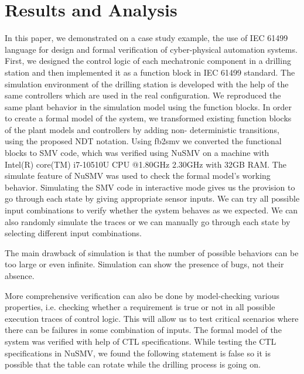 \documentclass[conference]{IEEEtran}
\begin{document}


\section{Results and Analysis}

In this paper, we demonstrated on a case study example, the use of IEC 61499 language for design and formal verification of cyber-physical automation systems. First, we designed the control logic of each mechatronic component in a drilling station and then implemented it as a function block in IEC 61499 standard. The simulation environment of the drilling station is developed with the help of the same controllers which are used in the real configuration. We reproduced the same plant behavior in the simulation model using the function blocks. In order to create a formal model of the system, we transformed existing function blocks of the plant models and controllers by adding non- deterministic transitions, using the proposed NDT notation. Using fb2smv  we converted the functional blocks to SMV code, which was verified using NuSMV on a machine with  Intel(R) core(TM) i7-10510U CPU @1.80GHz 2.30GHz  with 32GB RAM. The simulate feature of NuSMV was used to check the formal model's working behavior. Simulating the SMV code in interactive mode gives us the provision to go through each state by giving appropriate sensor inputs. We can try all possible input combinations to verify whether the system behaves as we expected. We can also randomly simulate the traces or we can manually go through each state by selecting different input combinations.

The main drawback of simulation is that the number of possible behaviors can be too large or even infinite. Simulation can show the presence of bugs, not their absence. 

More comprehensive verification can also be done by model-checking various properties, i.e. checking  whether a requirement  is true or not in all possible execution traces of control logic. This will allow us to test critical scenarios where there can be failures in some combination of inputs. The formal model of the system was verified with help of CTL \cite{emerson1985decision} specifications. While testing the CTL specifications in NuSMV, we found the following statement is false so it is possible that the table can rotate while the drilling process is going on.
\end{document}

